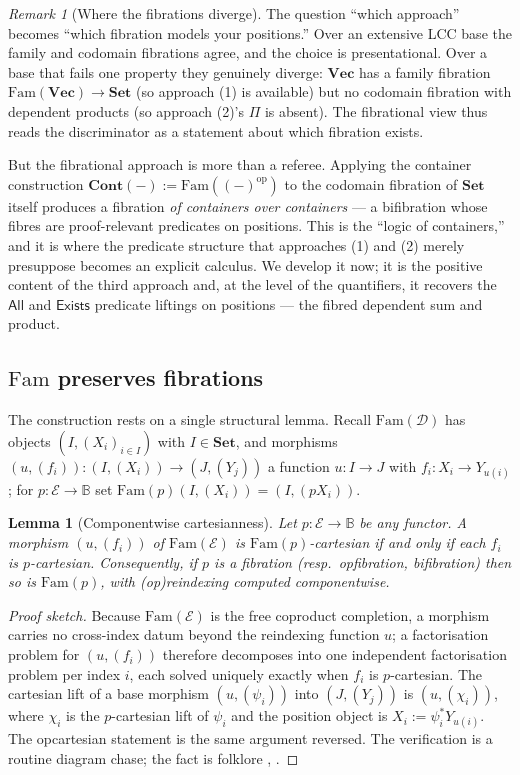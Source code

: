 \documentclass[11pt]{amsart}
\theoremstyle{plain}
\newtheorem{lemma}[theorem]{Lemma}
\theoremstyle{definition}
\theoremstyle{remark}
\newtheorem{remark}[theorem]{Remark}
\newcommand{\D}{\mathcal{D}}
\newcommand{\E}{\mathcal{E}}
\newcommand{\Set}{\mathbf{Set}}
\newcommand{\Vect}{\mathbf{Vec}}
\newcommand{\Fam}{\mathrm{Fam}}
\newcommand{\Cont}{\mathbf{Cont}}
\newcommand{\op}{\mathrm{op}}
\newcommand{\Exists}{\mathsf{Exists}}
\newcommand{\All}{\mathsf{All}}
\begin{document}
\begin{remark}[Where the fibrations diverge]\label{rem:fibdiverge}
The question ``which approach'' becomes ``which fibration models your positions.'' Over an extensive
LCC base the family and codomain fibrations agree, and the choice is presentational. Over a base that
fails one property they genuinely diverge: $\Vect$ has a family fibration $\Fam(\Vect)\to\Set$ (so
approach (1) is available) but no codomain fibration with dependent products (so approach (2)'s
$\Pi$ is absent). The fibrational view thus reads the discriminator as a statement about which
fibration exists.
\end{remark}

But the fibrational approach is more than a referee. Applying the container construction
$\Cont(-):=\Fam((-)^\op)$ to the codomain fibration of $\Set$ itself produces a fibration
\emph{of containers over containers} --- a bifibration whose fibres are proof-relevant predicates on
positions. This is the ``logic of containers,'' and it is where the predicate structure that
approaches (1) and (2) merely presuppose becomes an explicit calculus. We develop it now; it is the
positive content of the third approach and, at the level of the quantifiers, it recovers the
$\All$ and $\Exists$ predicate liftings on positions --- the fibred dependent sum and product.

\subsection{$\Fam$ preserves fibrations}\label{ss:fampreserves}
The construction rests on a single structural lemma. Recall $\Fam(\D)$ has objects $(I,(X_i)_{i\in I})$
with $I\in\Set$, and morphisms $(u,(f_i))\colon(I,(X_i))\to(J,(Y_j))$ a function $u\colon I\to J$ with
$f_i\colon X_i\to Y_{u(i)}$; for $p\colon\E\to\mathbb{B}$ set $\Fam(p)(I,(X_i))=(I,(pX_i))$.

\begin{lemma}[Componentwise cartesianness]\label{lem:fampres}
Let $p\colon\E\to\mathbb{B}$ be any functor. A morphism $(u,(f_i))$ of $\Fam(\E)$ is
$\Fam(p)$-cartesian if and only if each $f_i$ is $p$-cartesian. Consequently, if $p$ is a fibration
(resp.\ opfibration, bifibration) then so is $\Fam(p)$, with (op)reindexing computed componentwise.
\end{lemma}
\begin{proof}[Proof sketch]
Because $\Fam(\E)$ is the free coproduct completion, a morphism carries no cross-index datum beyond
the reindexing function $u$; a factorisation problem for $(u,(f_i))$ therefore decomposes into one
independent factorisation problem per index $i$, each solved uniquely exactly when $f_i$ is
$p$-cartesian. The cartesian lift of a base morphism $(u,(\psi_i))$ into $(J,(Y_j))$ is
$(u,(\chi_i))$, where $\chi_i$ is the $p$-cartesian lift of $\psi_i$ and the position object is
$X_i:=\psi_i^*Y_{u(i)}$. The opcartesian statement is the same argument reversed. The verification is a
routine diagram chase; the fact is folklore \cite[Ch.~1]{Jacobs}, \cite{Hermida}.
\end{proof}
\end{document}
